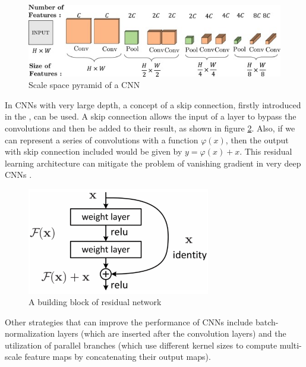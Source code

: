 \begin{figure}[H]
\begin{centering}
\includegraphics[width=12cm]{assets/images/cnn-layers.jpg}
\par\end{centering}
\caption{Scale space pyramid of a CNN \cite{Santosh2022-3}}
\label{fig:cnn-layers}
\end{figure}

In CNNs with very large depth, a concept of a skip connection, firstly introduced in the \cite{He2016}, can be used. A skip connection allows the input of a layer to bypass the convolutions and then be added to their result, as shown in figure \ref{fig:skip-conn}. Also, if we can represent a series of convolutions with a function $\varphi(x)$, then the output with skip connection included would be given by $y=\varphi(x) + x$. This residual learning architecture can mitigate the problem of vanishing gradient in very deep CNNs \cite{Santosh2022-2}.

\begin{figure}[H]
\begin{centering}
\includegraphics[width=8cm]{assets/images/skip-conn.png}
\par\end{centering}
\caption{A building block of residual network \cite{He2016}}
\label{fig:skip-conn}
\end{figure}

Other strategies that can improve the performance of CNNs include batch-normalization layers \cite{Ioffe2015}(which are inserted after the convolution layers) and the utilization of parallel branches \cite{Szegedy2015} (which use different kernel sizes to compute multi-scale feature maps by concatenating their output maps).

